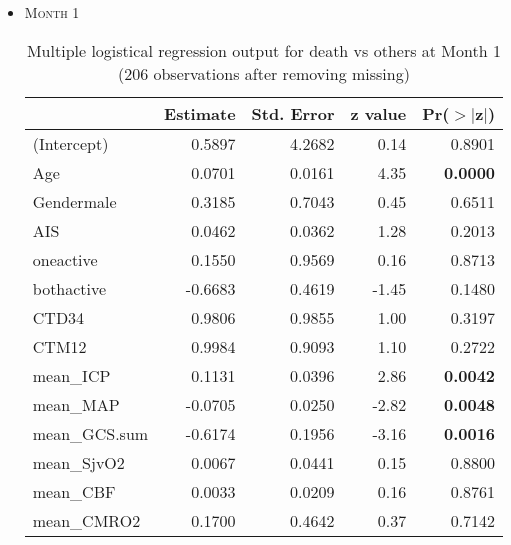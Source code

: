 \documentclass{article}
\begin{document}
\begin{itemize}
\item \textsc{Month 1}
\begin{table}[H]
\centering

\begin{tabular}{lrrrr}
  \hline
 & Estimate & Std. Error & z value & Pr($>$$|$z$|$) \\ 
  \hline
(Intercept) & 0.5897 & 4.2682 & 0.14 & 0.8901 \\ 
  Age & 0.0701 & 0.0161 & 4.35 & {\bf 0.0000} \\ 
  Gendermale & 0.3185 & 0.7043 & 0.45 & 0.6511 \\ 
  AIS & 0.0462 & 0.0362 & 1.28 & 0.2013 \\ 
  oneactive & 0.1550 & 0.9569 & 0.16 & 0.8713 \\ 
  bothactive & -0.6683 & 0.4619 & -1.45 & 0.1480 \\ 
  CTD34 & 0.9806 & 0.9855 & 1.00 & 0.3197 \\ 
  CTM12 & 0.9984 & 0.9093 & 1.10 & 0.2722 \\ 
  mean\_ICP & 0.1131 & 0.0396 & 2.86 & {\bf 0.0042} \\ 
  mean\_MAP & -0.0705 & 0.0250 & -2.82 & {\bf 0.0048} \\ 
  mean\_GCS.sum & -0.6174 & 0.1956 & -3.16 & {\bf 0.0016} \\ 
  mean\_SjvO2 & 0.0067 & 0.0441 & 0.15 & 0.8800 \\ 
  mean\_CBF & 0.0033 & 0.0209 & 0.16 & 0.8761 \\ 
  mean\_CMRO2 & 0.1700 & 0.4642 & 0.37 & 0.7142 \\ 
   \hline
\end{tabular}
\caption{Multiple logistical regression output for death vs others at Month 1 (206 observations after removing missing)}
\end{table}



\end{itemize}
\end{document}
